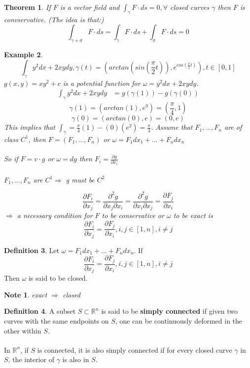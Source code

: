 \documentclass[12pt]{article}
\theoremstyle{plain}
\newtheorem*{note}{Note}
\newtheorem{theorem}{Theorem}[section]
\newtheorem{example}[theorem]{Example}
\theoremstyle{definition}
\newtheorem{definition}[theorem]{Definition}
\begin{document}
\begin{theorem}
  If $F$ is a vector field and $\int_\gamma F\cdot ds = 0, \forall$ closed curves $\gamma$ then $F$ is convservative. (The idea is that:)
  $$\int_{\gamma+\sigma} F\cdot ds = \int_\gamma F\cdot ds + \int_\sigma F\cdot ds = 0$$
\end{theorem}

\begin{example}
  $$\int_\gamma y^2 dx + 2xydy, \gamma (t) = (arctan(sin(\frac{\pi}{2}t)), e^{cos(\frac{\pi}{2}t)}), t\in [0,1]$$
  $g(x,y) = xy^2 + c$ is a potential function for $\omega = y^2 dx + 2xydy$.
  \\
  \begin{align*}
    \int_\gamma y^2 dx + 2xydy &= g(\gamma (1)) - g(\gamma (0))
  \end{align*}
  $$\gamma (1) = (arctan(1), e^0) = (\frac{\pi}{4}, 1)$$
  $$\gamma (0) = (arctan(0), e) = (0,e)$$
  This implies that $\int_\gamma = \frac{\pi}{4} (1) - (0)(e^2) = \frac{\pi}{4}$. Assume that $F_1,...,F_n $ are of class $C^1$, then $F = (F_1, ..., F_n)$ or $\omega = F_1 dx_1 + ... + F_n dx_n$\\
  \\
  So if $F = v \cdot g$ or $\omega = dg$ then $F_i = \frac{\partial g}{\partial x_i}$\\
  \\
  $F_1,...,F_n$ are $C^1 \Longrightarrow$ g must be $C^2$

  $$\frac{\partial F_i}{\partial x_j} = \frac{\partial^2 g}{\partial x_j \partial x_i} = \frac{\partial^2 g}{\partial x_i\partial x_j} = \frac{\partial F_j}{\partial x_i}$$
  $\Longrightarrow$ a necessary condition for $F$ to be conservative or $\omega$ to be exact is
  $$\frac{\partial F_i}{\partial x_j} = \frac{\partial F_j}{\partial x_i}, i,j \in [1,n], i\neq j$$
\end{example}

\begin{definition}
  Let $\omega = F_1 dx_1 + ... + F_n dx_n$. If
  $$\frac{\partial F_i}{\partial x_j} = \frac{\partial F_j}{\partial x_i}, i,j \in [1,n], i\neq j$$
  Then $\omega$ is said to be closed.
\end{definition}

\begin{note}
    exact $\Longrightarrow$ closed
\end{note}

\begin{definition}
  A subset $S\subset \mathbb{R}^n$ is said to be \textbf{simply connected} if given two curves with the same endpoints on $S$, one can be continuously deformed in the other within $S$.\\
  \\
  In $\mathbb{R}^n$, if $S$ is connected, it is also simply connected if for every closed curve $\gamma$ in $S$, the interior of $\gamma$ is also in $S$.
\end{definition}
\end{document}
